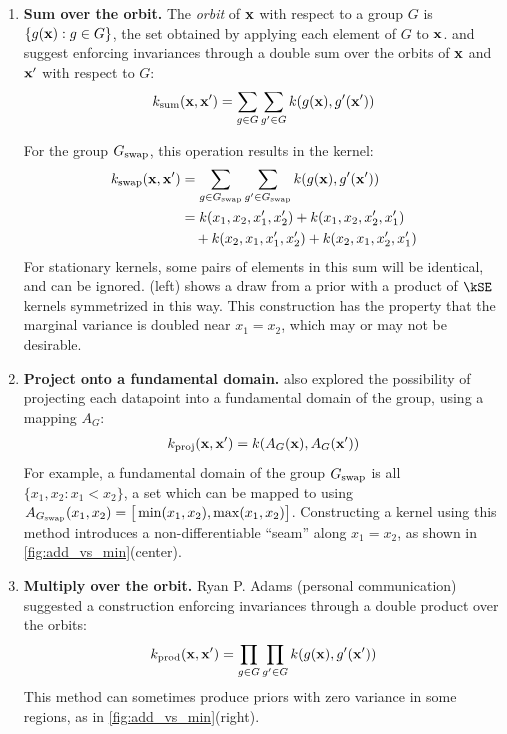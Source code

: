 %
\begin{enumerate}

\item {\bf Sum over the orbit.} 
The \emph{orbit} of ${\bf{x}}$ with respect to a group $G$ is ${\{g({\bf{x}}) : g \in G\}}$, the set obtained by applying each element of $G$ to ${\bf{x}}$.
\citet{ginsbourger2012argumentwise} and \citet{kondor2008group} suggest enforcing invariances through a double sum over the orbits of ${\bf{x}}$ and ${\bf{x}}'$ with respect to $G$:
%
\begin{align}
k_\textnormal{sum}({\bf{x}}, {\bf{x}}') = \sum_{g \in G} \sum_{g' \in G} k( g( {\bf{x}} ), g'( {\bf{x}}') )
\end{align}

For the group $G_\textnormal{swap}$, this operation results in the kernel:
%
\begin{align}
k_\textnormal{swap}({\bf{x}}, {\bf{x}}')
& = \sum_{g \in G_\textnormal{swap}} \sum_{g' \in G_\textnormal{swap}} k( g( {\bf{x}} ), g'( {\bf{x}}') ) \\
& = k(x_1, x_2, x_1', x_2') + k(x_1, x_2, x_2', x_1')  \nonumber \\ 
& \quad + k(x_2, x_1, x_1', x_2') + k(x_2, x_1, x_2', x_1')
\end{align}
%
For stationary kernels, some pairs of elements in this sum will be identical, and can be ignored.
(left) shows a draw from a \gp{} prior with a product of $\kSE$ kernels symmetrized in this way.
This construction has the property that the marginal variance is doubled near $x_1 = x_2$, which may or may not be desirable.



\item {\bf Project onto a fundamental domain.}
\citet{Invariances13} also explored the possibility of projecting each datapoint into a fundamental domain of the group, using a mapping $A_G$:
%
\begin{align}
k_\textnormal{proj}({\bf{x}}, {\bf{x}}') = k( A_G({\bf{x}}), A_G( {\bf{x}}') )
\end{align}
%
For example, a fundamental domain of the group $G_\textnormal{swap}$ is all ${\{x_1, x_2 : x_1 < x_2\}}$, a set which can be mapped to using $A_{G_\textnormal{swap}}( x_1, x_2 ) = \big[ \min(x_1, x_2), \max(x_1, x_2) \big]$.
Constructing a kernel using this method introduces a non-differentiable  ``seam'' along $x_1 = x_2$, as shown in \cref{fig:add_vs_min}(center).

\item {\bf Multiply over the orbit.}
Ryan P. Adams (personal communication) suggested a construction enforcing invariances through a double product over the orbits:
%
\begin{align}
k_\textnormal{prod}({\bf{x}}, {\bf{x}}') = \prod_{g \in G} \prod_{g' \in G} k( g( {\bf{x}} ), g'( {\bf{x}}') )
\end{align}
%
This method can sometimes produce \gp{} priors with zero variance in some regions, as in \cref{fig:add_vs_min}(right).
\end{enumerate}
